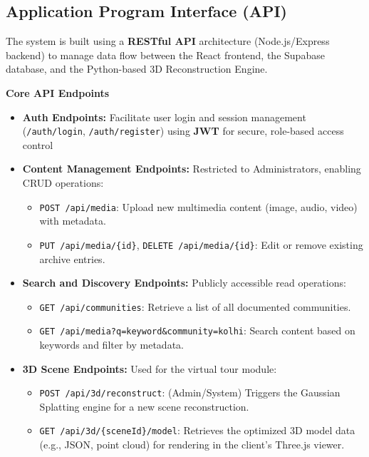 \subsection{Application Program Interface (API)}

The system is built using a \textbf{RESTful API} architecture (Node.js/Express backend) to manage data flow between the React frontend, the Supabase database, and the Python-based 3D Reconstruction Engine.

\vspace{0.2cm}
\noindent\textbf{Core API Endpoints}
\begin{itemize}
    \item \textbf{Auth Endpoints:} Facilitate user login and session management (\texttt{/auth/login}, \texttt{/auth/register}) using \textbf{JWT} for secure, role-based access control 
    \item \textbf{Content Management Endpoints:} Restricted to Administrators, enabling CRUD operations:
    \begin{itemize}
        \item \texttt{POST /api/media}: Upload new multimedia content (image, audio, video) with metadata.
        \item \texttt{PUT /api/media/\{id\}}, \texttt{DELETE /api/media/\{id\}}: Edit or remove existing archive entries.
    \end{itemize}
    \item \textbf{Search and Discovery Endpoints:} Publicly accessible read operations:
    \begin{itemize}
        \item \texttt{GET /api/communities}: Retrieve a list of all documented communities.
        \item \texttt{GET /api/media?q=keyword\&community=kolhi}: Search content based on keywords and filter by metadata.
    \end{itemize}
    \item \textbf{3D Scene Endpoints:} Used for the virtual tour module:
    \begin{itemize}
        \item \texttt{POST /api/3d/reconstruct}: (Admin/System) Triggers the Gaussian Splatting engine for a new scene reconstruction.
        \item \texttt{GET /api/3d/\{sceneId\}/model}: Retrieves the optimized 3D model data (e.g., JSON, point cloud) for rendering in the client's Three.js viewer.
    \end{itemize}
\end{itemize}


